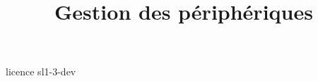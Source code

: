 \documentclass {beamer}
\title {Gestion des périphériques}
\begin{document}
 {licence}
 {sl1-3-dev}
\end{document}
